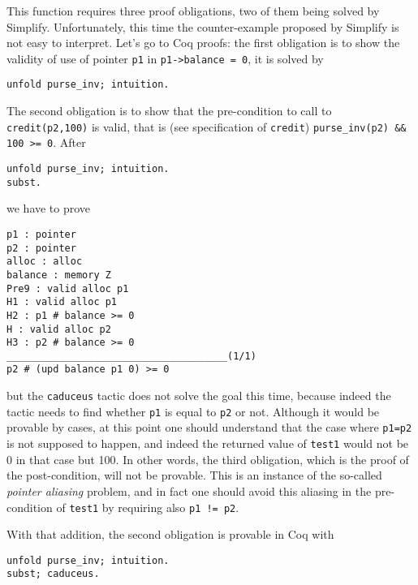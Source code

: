 \documentclass[12pt,a4paper,twoside,openright]{report}
\begin{document}
This function requires three proof obligations, two of them being
solved by Simplify. Unfortunately, this time the counter-example
proposed by Simplify is not easy to interpret. Let's go to Coq proofs:
the first obligation is to show the validity of use of pointer
\verb|p1| in \verb|p1->balance = 0|, it is solved by 
\begin{verbatim}
unfold purse_inv; intuition.
\end{verbatim}
The second obligation is to show that the pre-condition to call to
\verb|credit(p2,100)| is valid, that is (see specification of
\verb|credit|) \verb|purse_inv(p2) && 100 >= 0|. After
\begin{verbatim}
unfold purse_inv; intuition.
subst.
\end{verbatim}
we have to prove
\begin{verbatim}
p1 : pointer
p2 : pointer
alloc : alloc
balance : memory Z
Pre9 : valid alloc p1
H1 : valid alloc p1
H2 : p1 # balance >= 0
H : valid alloc p2
H3 : p2 # balance >= 0
______________________________________(1/1)
p2 # (upd balance p1 0) >= 0
\end{verbatim}
but the \verb|caduceus| tactic does not solve the goal this time,
because indeed the tactic needs to find whether \verb|p1| is equal to
\verb|p2| or not. Although it would be provable by cases, at this
point one should understand that the case where \verb|p1=p2| is not
supposed to happen, and indeed the returned value of \verb|test1| would not be
0 in that case but 100. In other words, the third obligation, which is
the proof of the post-condition, will not be provable. This is an
instance of the so-called \emph{pointer aliasing} problem, and in fact
one should avoid this aliasing in the pre-condition of \verb|test1| by
requiring also \verb|p1 != p2|. 

With that addition, the second obligation is provable in Coq with
\begin{verbatim}
unfold purse_inv; intuition.
subst; caduceus.
\end{verbatim}
\end{document}
